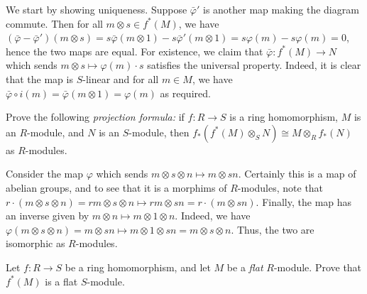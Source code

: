 \documentclass[../../master.tex]{subfiles}
\begin{document}
\begin{solution}
    We start by showing uniqueness.
    Suppose $\bar{\varphi}'$ is another map making the diagram commute.
    Then for all $m \otimes s \in f^{*}(M)$, we have $(\bar{\varphi} - \bar{\varphi}')(m \otimes s) = s\bar{\varphi}(m \otimes 1) - s\bar{\varphi}'(m \otimes 1) = s\varphi(m) - s\varphi(m) = 0$, hence the two maps are equal.
    For existence, we claim that $\bar{\varphi} : f^{*}(M) \to N$ which sends $m \otimes s \mapsto \varphi(m) \cdot s$ satisfies the universal property.
    Indeed, it is clear that the map is $S$-linear and for all $m \in M$, we have $\bar{\varphi} \circ i(m) = \bar{\varphi}(m \otimes 1) = \varphi(m)$ as required.
\end{solution}

\begin{problem}
    Prove the following \textit{projection formula:}
    if $f : R \to S$ is a ring homomorphism, $M$ is an $R$-module, and $N$ is an $S$-module, then $f_{*}(f^{*}(M) \otimes_S N) \cong M \otimes_R f_{*}(N)$ as $R$-modules.
\end{problem}

\begin{solution}
    Consider the map $\varphi$ which sends $m \otimes s \otimes n \mapsto m \otimes sn$.
    Certainly this is a map of abelian groups, and to see that it is a morphims of $R$-modules, note that $r \cdot (m \otimes s \otimes n) = rm \otimes s \otimes n \mapsto rm \otimes sn = r \cdot (m \otimes sn)$.
    Finally, the map has an inverse given by $m \otimes n \mapsto m \otimes 1 \otimes n$.
    Indeed, we have $\varphi(m \otimes s \otimes n) = m \otimes sn \mapsto m \otimes 1 \otimes sn = m \otimes s \otimes n$.
    Thus, the two are isomorphic as $R$-modules.
\end{solution}

\begin{problem}
    Let $f: R \to S$ be a ring homomorphism, and let $M$ be a \textit{flat} $R$-module.
    Prove that $f^{*}(M)$ is a flat $S$-module.
\end{problem}
\end{document}
